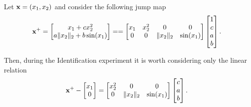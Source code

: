 \begin{exmp}\label{ex:ex3}
	Let $\mathbf{x}=(x_1,x_2)$ and consider the following jump map
	\begin{align}
	    {\mathbf{x}}^+=\begin{bmatrix}x_1+cx_2^2\\a\|x_2\|_2+b\sin(x_1)\end{bmatrix}=
	    =\begin{bmatrix}x_1&x_2^2&0&0\\0&0&\|x_2\|_2&\sin(x_1)\end{bmatrix}\begin{bmatrix}1\\c\\a\\b\end{bmatrix}.
	\end{align}
	
	Then, during the Identification experiment it is worth considering only the linear relation
	\begin{equation}
	    {\mathbf{x}}^+-\begin{bmatrix}x_1\\0\end{bmatrix}=\begin{bmatrix}x_2^2&0&0\\0&\|x_2\|_2&\sin(x_1)\end{bmatrix}\begin{bmatrix}c\\a\\b\end{bmatrix}.
	\end{equation}
\end{exmp}
%
